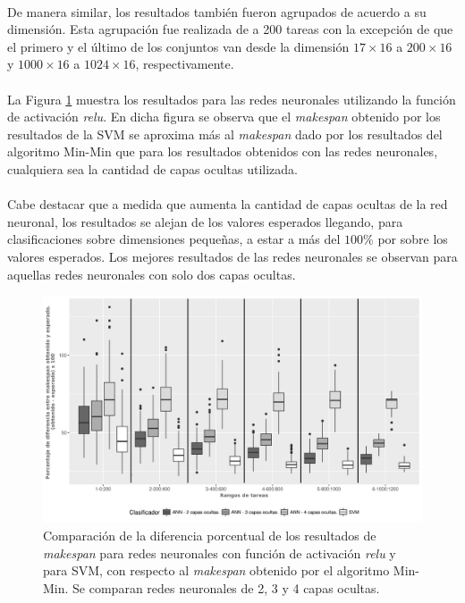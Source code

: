 \paragraph{} De manera similar, los resultados también fueron agrupados de acuerdo a su dimensión.
Esta agrupación fue realizada de a 200 tareas con la excepción de que el primero y el último de los conjuntos van desde la dimensión $17\times16$ a $200\times16$ y $1000\times16$ a $1024\times16$, respectivamente.

\paragraph{}La Figura \ref{fig:relu234} muestra los resultados para las redes neuronales utilizando la función de activación \textit{relu}.
En dicha figura se observa que el \textit{makespan} obtenido por los resultados de la SVM se aproxima más al \textit{makespan} dado por los resultados del algoritmo Min-Min que para los resultados obtenidos con las redes neuronales, cualquiera sea la cantidad de capas ocultas utilizada. 

\paragraph{} Cabe destacar que a medida que aumenta la cantidad de capas ocultas de la red neuronal, los resultados se alejan de los valores esperados llegando, para clasificaciones sobre dimensiones pequeñas, a estar a más del $100\%$ por sobre los valores esperados.
Los mejores resultados de las redes neuronales se observan para aquellas redes neuronales con solo dos capas ocultas.


\begin{figure}[H]
  \centering
  \includegraphics[width=\columnwidth]{imagenes/comparacion_anns_relu_2.png}
  \caption{Comparación de  la diferencia porcentual  de los resultados de \textit{makespan} para redes neuronales con función de activación \textit{relu} y para SVM, con respecto al \textit{makespan} obtenido por el algoritmo Min-Min.
Se comparan redes neuronales de 2, 3 y 4 capas ocultas.}
  \label{fig:relu234}
\end{figure}


